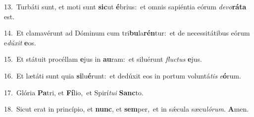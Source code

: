 {\numbfont\textcolor{\numbcolor}{13.}}~Turbáti sunt, et moti sunt \textbf{sic}\-ut \textbf{é}\-brius:~\star et omnis sapiéntia eórum \textit{de}\-\textit{vo}\textbf{rá}\textbf{ta} est.\par
{\numbfont\textcolor{\numbcolor}{14.}}~Et clamavérunt ad Dóminum cum tri\-\textbf{bu}\-la\-\textbf{rén}\-tur:~\star et de necessitátibus eórum e\-\textit{dú}\-\textit{xit} \textbf{e}\-os.\par
{\numbfont\textcolor{\numbcolor}{15.}}~Et státuit procéllam \textbf{e}\-jus in \textbf{au}\-ram:~\star et siluérunt \textit{fluc}\-\textit{tus} \textbf{e}\-jus.\par
{\numbfont\textcolor{\numbcolor}{16.}}~Et lætáti sunt quia \textbf{si}\-lu\-\textbf{é}\-runt:~\star et dedúxit eos in portum voluntá\textit{tis} \textit{e}\-\textbf{ó}rum.\par
{\numbfont\textcolor{\numbcolor}{17.}}~Glória \textbf{Pa}\-tri, et \textbf{Fí}\-lio,~\star et Spirí\-\textit{tu}\-\textit{i} \textbf{Sanc}\-to.\par
{\numbfont\textcolor{\numbcolor}{18.}}~Sicut erat in princípio, et \textbf{nunc}\-, et \textbf{sem}\-per,~\star et in sǽcula sæcu\-\textit{ló}\-\textit{rum}. \textbf{A}\-men.\par

